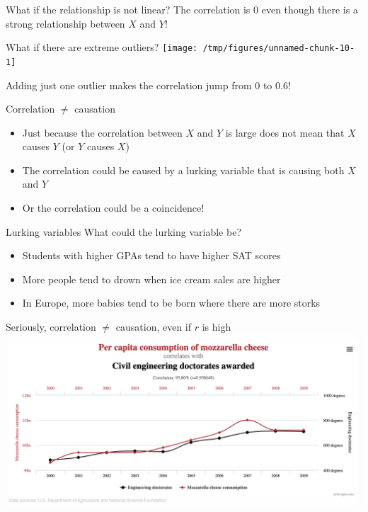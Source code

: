 \documentclass{beamer}\usepackage[]{graphicx}\usepackage[]{color}
\newenvironment{knitrout}{}{} %
\begin{document}
\begin{darkframes}
\begin{frame}{What if the relationship is not linear?}
\begin{knitrout}
\end{knitrout}
      \pause
      \vspace{-0.5in}
      The correlation is 0 even though there is a strong relationship between $X$ and $Y$!
    \end{frame}

    \begin{frame}{What if there are extreme outliers?}
\begin{knitrout}
\color{fgcolor}
\texttt{[image: /tmp/figures/unnamed-chunk-10-1]} 

\end{knitrout}

      \pause
      \vspace{0.2in}
      Adding just one outlier makes the correlation jump from 0 to 0.6!
    \end{frame}

    \begin{frame}{Correlation $\neq$ causation}
      \begin{itemize}[<+->]
        \item Just because the correlation between $X$ and $Y$ is large does not mean that $X$ causes $Y$ (or $Y$ causes $X$)
        \item The correlation could be caused by a \alert{lurking variable} that is causing both $X$ and $Y$
        \item Or the correlation could be a coincidence!
      \end{itemize}
    \end{frame}

    \begin{frame}{Lurking variables}
      What could the lurking variable be?
      \begin{itemize}[<+->]
        \item Students with higher GPAs tend to have higher SAT scores
        \item More people tend to drown when ice cream sales are higher
        \item In Europe, more babies tend to be born where there are more storks
      \end{itemize}
    \end{frame}

    \begin{frame}{Seriously, correlation $\neq$ causation, even if $r$ is high}
      \includegraphics[width=\textwidth]{spurious}
    \end{frame}


\end{darkframes}
\end{document}
